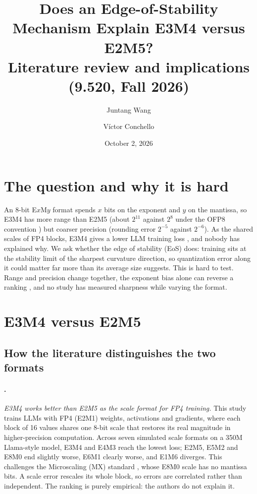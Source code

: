 \documentclass[11pt,letterpaper]{article}
\title{\vspace{-1.6em}Does an Edge-of-Stability Mechanism Explain E3M4 versus E2M5?\\[2pt]
\large Literature review and implications (9.520, Fall 2026)}
\author{Juntang Wang \and V\'ictor Conchello}
\date{October 2, 2026}
\begin{document}
\maketitle
\vspace{-2em}

\section{The question and why it is hard}

An 8-bit E$x$M$y$ format spends $x$ bits on the exponent and $y$ on the mantissa, so E3M4 has more range than E2M5 (about $2^{11}$ against $2^{8}$ under the OFP8 convention \citep{Micikevicius2022}) but coarser precision (rounding error $2^{-5}$ against $2^{-6}$). As the shared scales of FP4 blocks, E3M4 gives a lower LLM training loss \citep{Chmiel2025}, and nobody has explained why. We ask whether the edge of stability (EoS) does: training sits at the stability limit of the sharpest curvature direction, so quantization error along it could matter far more than its average size suggests. This is hard to test. Range and precision change together, the exponent bias alone can reverse a ranking \citep{Kuzmin2022}, and no study has measured sharpness while varying the format.

\section{E3M4 versus E2M5}

\subsection{How the literature distinguishes the two formats}

\paragraph{\citet{Chmiel2025}.}
\emph{E3M4 works better than E2M5 as the scale format for FP4 training.} This study trains LLMs with FP4 (E2M1) weights, activations and gradients, where each block of 16 values shares one 8-bit scale that restores its real magnitude in higher-precision computation. Across seven simulated scale formats on a 350M Llama-style model, E3M4 and E4M3 reach the lowest loss; E2M5, E5M2 and E8M0 end slightly worse, E6M1 clearly worse, and E1M6 diverges. This challenges the Microscaling (MX) standard \citep{Rouhani2023}, whose E8M0 scale has no mantissa bits. A scale error rescales its whole block, so errors are correlated rather than independent. The ranking is purely empirical: the authors do not explain it.
\end{document}
